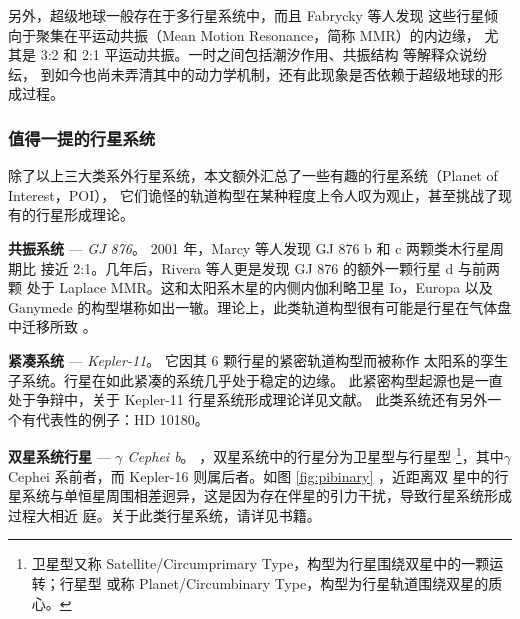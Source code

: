 另外，超级地球一般存在于多行星系统中\cite{Borucki2011}，而且 Fabrycky 等人发现
这些行星倾向于聚集在平运动共振（Mean Motion Resonance，简称 MMR）的内边缘，
尤其是 3:2 和 2:1 平运动共振\cite{Fabrycky2014}。一时之间包括潮汐作用、共振结构
等解释众说纷纭\cite{LithwickWu2012,Lee2013,Batygin2013,Baruteau2013,Delisle2014,Chatterjee2015}，
到如今也尚未弄清其中的动力学机制，还有此现象是否依赖于超级地球的形成过程。

\subsubsection{值得一提的行星系统}  \label{sec:pexample}

除了以上三大类系外行星系统，本文额外汇总了一些有趣的行星系统（Planet of Interest，POI），
它们诡怪的轨道构型在某种程度上令人叹为观止，甚至挑战了现有的行星形成理论。

\textbf{共振系统} --- \textit{GJ 876}。  {} 2001 年，Marcy 等人发现 GJ 876 b 和 c 两颗类木行星周期比
接近 2:1\cite{Marcy2001}。几年后，Rivera 等人更是发现 GJ 876 的额外一颗行星 d 与前两颗
处于 Laplace MMR\cite{Rivera2010}。这和太阳系木星的内侧内伽利略卫星 Io，Europa 以及 
Ganymede 的构型堪称如出一辙。理论上，此类轨道构型很有可能是行星在气体盘中迁移所致
\cite{KleyNelson2012,ZhangZhou2010}。

\textbf{紧凑系统} --- \textit{Kepler-11}。  {} 它因其 6 颗行星的紧密轨道构型\cite{Lissauer2011}而被称作
太阳系的孪生子系统\cite{Zhou2012}。行星在如此紧凑的系统几乎处于稳定的边缘\cite{Mahajan2014}。
此紧密构型起源也是一直处于争辩中，关于 Kepler-11 行星系统形成理论详见文献。
此类系统还有另外一个有代表性的例子：HD 10180\cite{Lovis2011}。

\textbf{双星系统行星} --- \textit{$\gamma$ Cephei b}。  {} ，双星系统中的行星分为卫星型与行星型
\footnote{卫星型又称 Satellite/Circumprimary Type，构型为行星围绕双星中的一颗运转；行星型
或称 Planet/Circumbinary Type，构型为行星轨道围绕双星的质心。}，其中$\gamma$ Cephei
\cite{Hatzes2003} 系前者，而 Kepler-16\cite{Doyle2011} 则属后者。如图 \ref{fig:pibinary} ，近距离双
星中的行星系统与单恒星周围相差迥异，这是因为存在伴星的引力干扰，导致行星系统形成过程大相近
庭。关于此类行星系统，请详见书籍。

